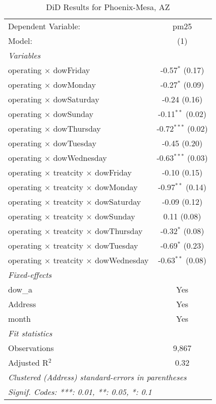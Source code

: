 
\begin{table}[htbp]
   \caption{DiD Results for Phoenix-Mesa, AZ}
   \centering
   \begin{tabular}{lc}
      \tabularnewline \midrule \midrule
      Dependent Variable:                                  & pm25\\  
      Model:                                               & (1)\\  
      \midrule
      \emph{Variables}\\
      operating $\times$ dowFriday                         & -0.57$^{*}$ (0.17)\\   
      operating $\times$ dowMonday                         & -0.27$^{*}$ (0.09)\\   
      operating $\times$ dowSaturday                       & -0.24 (0.16)\\   
      operating $\times$ dowSunday                         & -0.11$^{**}$ (0.02)\\   
      operating $\times$ dowThursday                       & -0.72$^{***}$ (0.02)\\   
      operating $\times$ dowTuesday                        & -0.45 (0.20)\\   
      operating $\times$ dowWednesday                      & -0.63$^{***}$ (0.03)\\   
      operating $\times$ treatcity $\times$ dowFriday      & -0.10 (0.15)\\   
      operating $\times$ treatcity $\times$ dowMonday      & -0.97$^{**}$ (0.14)\\   
      operating $\times$ treatcity $\times$ dowSaturday    & -0.09 (0.12)\\   
      operating $\times$ treatcity $\times$ dowSunday      & 0.11 (0.08)\\   
      operating $\times$ treatcity $\times$ dowThursday    & -0.32$^{*}$ (0.08)\\   
      operating $\times$ treatcity $\times$ dowTuesday     & -0.69$^{*}$ (0.23)\\   
      operating $\times$ treatcity $\times$ dowWednesday   & -0.63$^{**}$ (0.08)\\   
      \midrule
      \emph{Fixed-effects}\\
      dow\_a                                               & Yes\\  
      Address                                              & Yes\\  
      month                                                & Yes\\  
      \midrule
      \emph{Fit statistics}\\
      Observations                                         & 9,867\\  
      Adjusted R$^2$                                       & 0.32\\  
      \midrule \midrule
      \multicolumn{2}{l}{\emph{Clustered (Address) standard-errors in parentheses}}\\
      \multicolumn{2}{l}{\emph{Signif. Codes: ***: 0.01, **: 0.05, *: 0.1}}\\
   \end{tabular}
\end{table}


